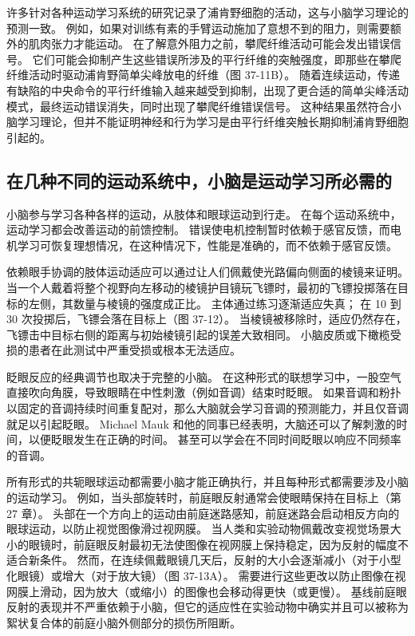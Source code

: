 许多针对各种运动学习系统的研究记录了浦肯野细胞的活动，这与小脑学习理论的预测一致。 例如，如果对训练有素的手臂运动施加了意想不到的阻力，则需要额外的肌肉张力才能运动。 在了解意外阻力之前，攀爬纤维活动可能会发出错误信号。 它们可能会抑制产生这些错误所涉及的平行纤维的突触强度，即那些在攀爬纤维活动时驱动浦肯野简单尖峰放电的纤维（图 37-11B）。 随着连续运动，传递有缺陷的中央命令的平行纤维输入越来越受到抑制，出现了更合适的简单尖峰活动模式，最终运动错误消失，同时出现了攀爬纤维错误信号。 这种结果虽然符合小脑学习理论，但并不能证明神经和行为学习是由平行纤维突触长期抑制浦肯野细胞引起的。

\subsection{在几种不同的运动系统中，小脑是运动学习所必需的}

小脑参与学习各种各样的运动，从肢体和眼球运动到行走。 在每个运动系统中，运动学习都会改善运动的前馈控制。 错误使电机控制暂时依赖于感官反馈，而电机学习可恢复理想情况，在这种情况下，性能是准确的，而不依赖于感官反馈。

依赖眼手协调的肢体运动适应可以通过让人们佩戴使光路偏向侧面的棱镜来证明。 当一个人戴着将整个视野向左移动的棱镜护目镜玩飞镖时，最初的飞镖投掷落在目标的左侧，其数量与棱镜的强度成正比。 主体通过练习逐渐适应失真； 在 10 到 30 次投掷后，飞镖会落在目标上（图 37-12）。 当棱镜被移除时，适应仍然存在，飞镖击中目标右侧的距离与初始棱镜引起的误差大致相同。 小脑皮质或下橄榄受损的患者在此测试中严重受损或根本无法适应。

眨眼反应的经典调节也取决于完整的小脑。 在这种形式的联想学习中，一股空气直接吹向角膜，导致眼睛在中性刺激（例如音调）结束时眨眼。 如果音调和粉扑以固定的音调持续时间重复配对，那么大脑就会学习音调的预测能力，并且仅音调就足以引起眨眼。 Michael Mauk 和他的同事已经表明，大脑还可以了解刺激的时间，以便眨眼发生在正确的时间。 甚至可以学会在不同时间眨眼以响应不同频率的音调。

所有形式的共轭眼球运动都需要小脑才能正确执行，并且每种形式都需要涉及小脑的运动学习。 例如，当头部旋转时，前庭眼反射通常会使眼睛保持在目标上（第 27 章）。 头部在一个方向上的运动由前庭迷路感知，前庭迷路会启动相反方向的眼球运动，以防止视觉图像滑过视网膜。 当人类和实验动物佩戴改变视觉场景大小的眼镜时，前庭眼反射最初无法使图像在视网膜上保持稳定，因为反射的幅度不适合新条件。 然而，在连续佩戴眼镜几天后，反射的大小会逐渐减小（对于小型化眼镜）或增大（对于放大镜）（图 37-13A）。 需要进行这些更改以防止图像在视网膜上滑动，因为放大（或缩小）的图像也会移动得更快（或更慢）。 基线前庭眼反射的表现并不严重依赖于小脑，但它的适应性在实验动物中确实并且可以被称为絮状复合体的前庭小脑外侧部分的损伤所阻断。

